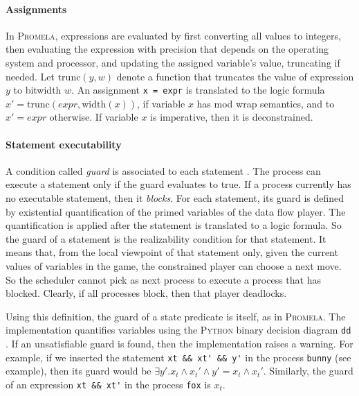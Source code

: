 \documentclass[copyright]{eptcs}
\begin{document}
\paragraph{Assignments}

In \textsc{Promela}, expressions are evaluated by first converting all values to integers, then evaluating the expression with precision that depends on the operating system and processor, and updating the assigned variable's value, truncating if needed.
Let $\mathrm{trunc}(y, w)$ denote a function that truncates the value of expression $y$ to bitwidth $w$.
An assignment \verb+x = expr+ is translated to the logic formula $x' = \mathrm{trunc}(\mathit{expr}, \mathrm{width}(x))$, if variable $x$ has mod wrap semantics, and to $x' = \mathit{expr}$ otherwise.
If variable $x$ is imperative, then it is deconstrained.


\paragraph{Statement executability}

A condition called {\em guard} is associated to each statement \cite{Dijkstra75cacm}.
The process can execute a statement only if the guard evaluates to true.
If a process currently has no executable statement, then it {\em blocks}.
For each statement, its guard is defined by existential quantification of the primed variables of the data flow player.
The quantification is applied after the statement is translated to a logic formula.
So the guard of a statement is the realizability condition for that statement.
It means that, from the local viewpoint of that statement only, given the current values of variables in the game, the constrained player can choose a next move.
So the scheduler cannot pick as next process to execute a process that has blocked.
Clearly, if all processes block, then that player deadlocks.

Using this definition, the guard of a state predicate is itself, as in \textsc{Promela}.
The implementation quantifies variables using the \textsc{Python} binary decision diagram \texttt{dd} \cite{Filippidis15github-dd}.
If an unsatisfiable guard is found, then the implementation raises a warning.
For example, if we inserted the statement \verb+xt && xt' && y'+ in the process \texttt{bunny} (see example), then its guard would be $\exists y'. x_t \wedge x_t' \wedge y' = x_t \wedge x_t'$.
Similarly, the guard of an expression \verb+xt && xt'+ in the process \texttt{fox} is $x_t$.
\clearpage{}
\clearpage{}\def\ps{\mathit{ps}}
\def\pc{\mathit{pc}}
\def\key{\mathrm{key}}
\def\ex{\mathit{ex}}
\def\gids{\mathrm{gids}}
\def\pids{\mathrm{pids}}
\def\oute{\mathrm{oute}}
\def\guard{\mathrm{guard}}
\def\inv{\mathrm{inv}}
\def\pmt{\mathit{pm}}
\end{document}
